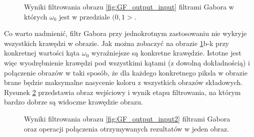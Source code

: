 \begin{figure}[ht]
  \caption{Wyniki filtrowania obrazu \ref{fig:GF_output_input} filtrami Gabora w których $\omega_0$ jest w przedziale $(0, 1>$.}
  \label{fig:GF_output}
\end{figure}

Co warto nadmienić, filtr Gabora przy jednokrotnym zastosowaniu nie wykryje wszystkich krawędzi w obrazie. Jak można zobaczyć na obrazie \ref{fig:GF_output}b-k przy konkretnej wartości kąta $\omega_0$ wyraźniejsze są konkretne krawędzie. Istotne jest więc wyodrębnienie krawędzi pod wszystkimi kątami (z dowolną dokładnością) i połączenie obrazów w taki sposób, że dla każdego konkretnego piksla w obrazie brane będzie maksymalne nasycenie koloru z wszystkich obrazów składowych.\\

Rysunek \ref{fig:GF_output_join} przedstawia obraz wejściowy i wynik etapu filtrowania, na którym bardzo dobrze są widoczne krawędzie obrazu.

\begin{figure}[ht]
  \centering
  \caption{Wyniki filtrowania obrazu \ref{fig:GF_output_input2} filtrami Gabora oraz operacji połączenia otrzymywanych rezultatów w jeden obraz.}
  \label{fig:GF_output_join}
\end{figure}

